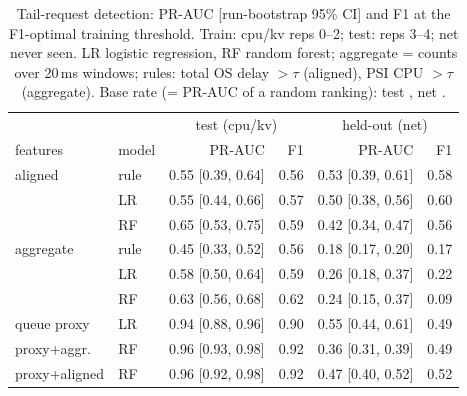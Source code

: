 \begin{table}[t]\centering\caption{Tail-request detection: PR-AUC [run-bootstrap 95\% CI] and F1 at the F1-optimal training threshold. Train: cpu/kv reps 0--2; test: reps 3--4; net never seen. LR logistic regression, RF random forest; aggregate = counts over 20\,ms windows; rules: total OS delay $>\tau$ (aligned), PSI CPU $>\tau$ (aggregate). Base rate (= PR-AUC of a random ranking): test \baseApTest, net \baseApHeld.}\label{tab:detect}\scriptsize\setlength{\tabcolsep}{2.5pt}
\begin{tabular}{llrrrr}\toprule
& & \multicolumn{2}{c}{test (cpu/kv)} & \multicolumn{2}{c}{held-out (net)}\\
features & model & PR-AUC & F1 & PR-AUC & F1\\\midrule
aligned & rule & 0.55 [0.39, 0.64] & 0.56 & 0.53 [0.39, 0.61] & 0.58 \\
 & LR & 0.55 [0.44, 0.66] & 0.57 & 0.50 [0.38, 0.56] & 0.60 \\
 & RF & 0.65 [0.53, 0.75] & 0.59 & 0.42 [0.34, 0.47] & 0.56 \\
\addlinespace[2pt]
aggregate & rule & 0.45 [0.33, 0.52] & 0.56 & 0.18 [0.17, 0.20] & 0.17 \\
 & LR & 0.58 [0.50, 0.64] & 0.59 & 0.26 [0.18, 0.37] & 0.22 \\
 & RF & 0.63 [0.56, 0.68] & 0.62 & 0.24 [0.15, 0.37] & 0.09 \\
\addlinespace[2pt]
queue proxy & LR & 0.94 [0.88, 0.96] & 0.90 & 0.55 [0.44, 0.61] & 0.49 \\
\addlinespace[2pt]
proxy+aggr. & RF & 0.96 [0.93, 0.98] & 0.92 & 0.36 [0.31, 0.39] & 0.49 \\
\addlinespace[2pt]
proxy+aligned & RF & 0.96 [0.92, 0.98] & 0.92 & 0.47 [0.40, 0.52] & 0.52 \\
\bottomrule\end{tabular}\end{table}
